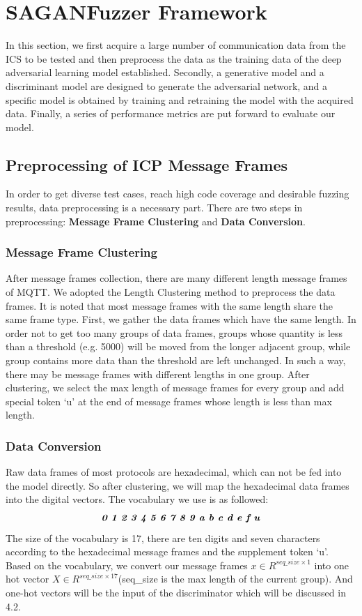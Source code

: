 \section{SAGANFuzzer Framework}
In this section, we first acquire a large number of communication data from the ICS to be tested and then preprocess the data as the training data of the deep adversarial learning model established. Secondly, a generative model and a discriminant model are designed to generate the adversarial network, and a specific model is obtained by training and retraining the model with the acquired data. Finally, a series of performance metrics are put forward to evaluate our model.


\subsection{Preprocessing of ICP Message Frames}
In order to get diverse test cases, reach high code coverage and desirable fuzzing results, data preprocessing is a necessary part. There are two steps in preprocessing: \textbf{Message Frame Clustering} and \textbf{Data Conversion}.

\subsubsection{\textbf{Message Frame Clustering}}
After message frames collection, there are many different length message frames of MQTT. We adopted the Length Clustering method to preprocess the data frames. It is noted that most message frames with the same length share the same frame type. First, we gather the data frames which have the same length. In order not to get too many groups of data frames, groups whose quantity is less than a threshold (e.g. 5000) will be moved from the longer adjacent group, while group contains more data than the threshold are left unchanged. In such a way, there may be message frames with different lengths in one group. After clustering, we select the max length of message frames for every group and add special token `u' at the end of message frames whose length is less than max length.

\subsubsection{\textbf{Data Conversion}}
Raw data frames of most protocols are hexadecimal, which can not be fed into the model directly. So after clustering, we will map the hexadecimal data frames into the digital vectors. The vocabulary we use is as followed:
\begin{equation}
\textit{\textbf{0 1 2 3 4 5 6 7 8 9 a b c d e f u}}
\end{equation}
The size of the vocabulary is 17, there are ten digits and seven characters according to the hexadecimal message frames and the supplement token `u'.
Based on the vocabulary, we convert our message frames $x \in R^{seq\_size \times 1}$ into one hot vector $X \in R^{seq\_size \times 17}$(seq\_size is the max length of the current group). And one-hot vectors will be the input of the discriminator which will be discussed in \textcolor[rgb]{1,0,0}{4.2}.

